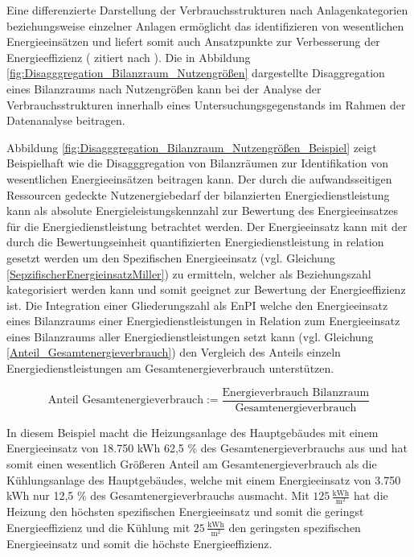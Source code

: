 Eine differenzierte Darstellung der Verbrauchsstrukturen nach Anlagenkategorien beziehungsweise einzelner Anlagen ermöglicht das identifizieren von 
wesentlichen Energieeinsätzen und liefert somit auch Ansatzpunkte zur Verbesserung der Energieeffizienz (\cite{Fink.1997} zitiert nach \cite[S. 8]{Hohnhold.2013}).
Die in Abbildung \eqref{fig:Disagggregation_Bilanzraum_Nutzengrößen} dargestellte Disaggregation eines Bilanzraums nach Nutzengrößen kann bei der Analyse der 
Verbrauchsstrukturen innerhalb eines Untersuchungsgegenstands im Rahmen der Datenanalyse beitragen.



Abbildung \eqref{fig:Disagggregation_Bilanzraum_Nutzengrößen_Beispiel} zeigt Beispielhaft wie die Disagggregation von Bilanzräumen zur Identifikation von 
wesentlichen Energieeinsätzen beitragen kann. 
Der durch die aufwandsseitigen Ressourcen gedeckte Nutzenergiebedarf der bilanzierten Energiedienstleistung kann als absolute Energieleistungskennzahl zur 
Bewertung des Energieeinsatzes für die Energiedienstleistung betrachtet werden.
Der Energieeinsatz kann mit der durch die Bewertungseinheit quantifizierten Energiedienstleistung in relation gesetzt werden um den Spezifischen Energieeinsatz 
(vgl. Gleichung \eqref{SepzifischerEnergieinsatzMiller}) zu ermitteln, welcher als Beziehungszahl kategorisiert werden kann und somit geeignet zur Bewertung der Energieeffizienz ist. 
Die Integration einer Gliederungszahl als EnPI welche den Energieeinsatz eines Bilanzraums einer Energiedienstleistungen in Relation 
zum Energieeinsatz eines Bilanzraums aller Energiedienstleistungen setzt kann (vgl. Gleichung \eqref{Anteil_Gesamtenergieverbrauch}) den Vergleich des Anteils einzeln Energiedienstleistungen 
am Gesamtenergieverbrauch unterstützen.


\begin{equation}
    \text{Anteil Gesamtenergieverbrauch} :=\frac{\text{Energieverbrauch Bilanzraum}}{\text{Gesamtenergieverbrauch}}
    \label{Anteil_Gesamtenergieverbrauch}
\end{equation}

In diesem Beispiel macht die Heizungsanlage des Hauptgebäudes mit einem Energieeinsatz von 18.750 kWh 62,5 \% des Gesamtenergieverbrauchs aus und hat somit einen 
wesentlich Größeren Anteil am Gesamtenergieverbrauch als die Kühlungsanlage des Hauptgebäudes, welche mit einem Energieeinsatz von 3.750 kWh nur 12,5 \% des 
Gesamtenergieverbrauchs ausmacht.
Mit \( 125 \,\frac{\text{kWh}}{\text{m}^2} \) hat die Heizung den höchsten spezifischen Energieeinsatz und somit die geringst Energieeffizienz und die Kühlung 
mit \( 25 \,\frac{\text{kWh}}{\text{m}^2} \) den geringsten spezifischen Energieeinsatz und somit die höchste Energieeffizienz.


